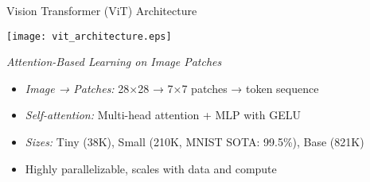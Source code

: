 \begin{slide}[\slideopts,toc={ViT}]{Vision Transformer (ViT) Architecture}
  
  \centerline{\texttt{[image: vit\_architecture.eps]}}

  \emph{Attention-Based Learning on Image Patches}
  
  \begin{itemize}
    \item \emph{Image → Patches:} 28×28 → 7×7 patches → token sequence
    
    \item \emph{Self-attention:} Multi-head attention + MLP with GELU
    
    \item \emph{Sizes:} Tiny (38K), Small (210K, MNIST SOTA: 99.5\%), Base (821K)
    
    \item Highly parallelizable, scales with data and compute
  \end{itemize}
  
\end{slide}
